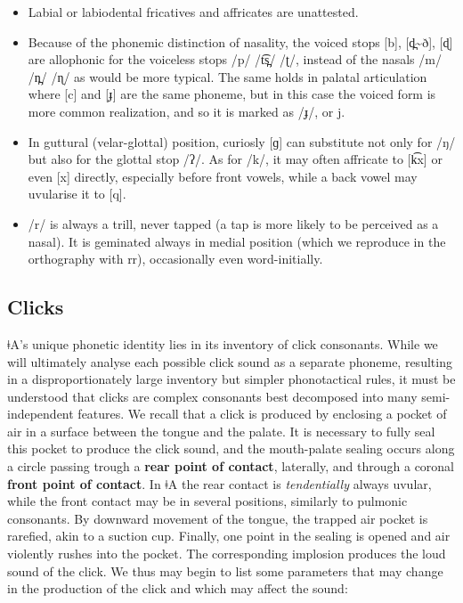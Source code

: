 \documentclass[11pt,a5paper]{book}
\newcommand{\qcn}[1]{\textcolor{AccentText}{\large#1}}
\newcommand{\langname}{\qcn{ǂA}}
\begin{document}
\begin{itemize}
	\item Labial or labiodental fricatives and affricates are unattested.
	\item Because of the phonemic distinction of nasality, the voiced stops [b], [d̪\textasciitilde{}ð], [ɖ] are allophonic for the voiceless stops /p/ /t͡s̪/ /ʈ/, instead of the nasals /m/ /n̪/ /ɳ/ as would be more typical. The same holds in palatal articulation where [c] and [ɟ] are the same phoneme, but in this case the voiced form is more common realization, and so it is marked as /ɟ/, or \qcn{j}.
	\item In guttural (velar-glottal) position, curiosly [ɡ] can substitute not only for /ŋ/ but also for the glottal stop /ʔ/. As for /k/, it may often affricate to [k͡x] or even [x] directly, especially before front vowels, while a back vowel may uvularise it to [q].
	\item /r/ is always a trill, never tapped (a tap is more likely to be perceived as a nasal). It is geminated always in medial position (which we reproduce in the orthography with \qcn{rr}), occasionally even word-initially.
\end{itemize}


\subsection{Clicks}

\langname's unique phonetic identity lies in its inventory of click consonants. While we will ultimately analyse each possible click sound as a separate phoneme, resulting in a disproportionately large inventory but simpler phonotactical rules, it must be understood that clicks are complex consonants best decomposed into many semi-independent features. We recall that a click is produced by enclosing a pocket of air in a surface between the tongue and the palate. It is necessary to fully seal this pocket to produce the click sound, and the mouth-palate sealing occurs along a circle passing trough a \textbf{rear point of contact}, laterally, and through a coronal \textbf{front point of contact}. In \langname{} the rear contact is \emph{tendentially} always uvular, while the front contact may be in several positions, similarly to pulmonic consonants. By downward movement of the tongue, the trapped air pocket is rarefied, akin to a suction cup. Finally, one point in the sealing is opened and air violently rushes into the pocket. The corresponding implosion produces the loud sound of the click. We thus may begin to list some parameters that may change in the production of the click and which may affect the sound:
\end{document}
